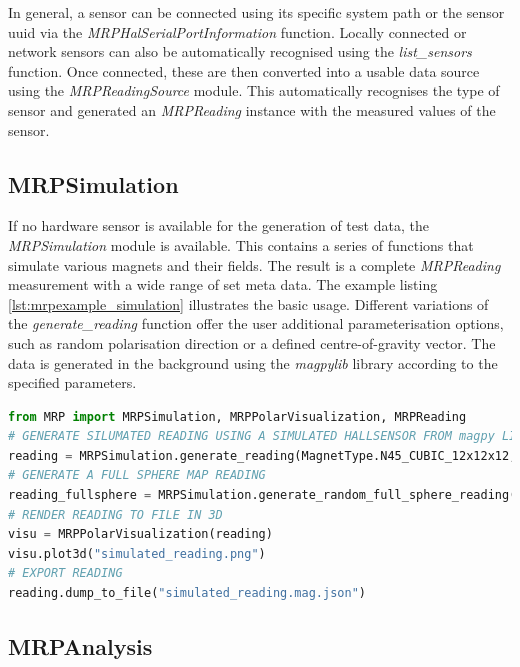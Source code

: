 In general, a sensor can be connected using its specific system path or
the sensor \gls{uuid} via the \emph{MRPHalSerialPortInformation}
function. Locally connected or network sensors can also be automatically
recognised using the \emph{list\_sensors} function. Once connected,
these are then converted into a usable data source using the
\emph{MRPReadingSource} module. This automatically recognises the type
of sensor and generated an \emph{MRPReading} instance with the measured
values of the sensor.

\hypertarget{mrpsimulation}{%
\subsection{MRPSimulation}\label{mrpsimulation}}

If no hardware sensor is available for the generation of test data, the
\emph{MRPSimulation} module is available. This contains a series of
functions that simulate various magnets and their fields. The result is
a complete \emph{MRPReading} measurement with a wide range of set meta
data. The example listing \ref{lst:mrpexample_simulation} illustrates
the basic usage. Different variations of the \emph{generate\_reading}
function offer the user additional parameterisation options, such as
random polarisation direction or a defined centre-of-gravity vector. The
data is generated in the background using the \emph{magpylib}
 library according to the specified parameters.

\begin{lstlisting}[language=Python, caption={MRPSimulation example illustrates the usage of several functions how to generate simulated magnets}, label=lst:mrpexample_simulation]
from MRP import MRPSimulation, MRPPolarVisualization, MRPReading
# GENERATE SILUMATED READING USING A SIMULATED HALLSENSOR FROM magpy LIBRARY
reading = MRPSimulation.generate_reading(MagnetType.N45_CUBIC_12x12x12,_add_random_polarisation=True)
# GENERATE A FULL SPHERE MAP READING
reading_fullsphere = MRPSimulation.generate_random_full_sphere_reading()
# RENDER READING TO FILE IN 3D
visu = MRPPolarVisualization(reading)
visu.plot3d("simulated_reading.png")
# EXPORT READING
reading.dump_to_file("simulated_reading.mag.json")
\end{lstlisting}

\hypertarget{mrpanalysis}{%
\subsection{MRPAnalysis}\label{mrpanalysis}}

